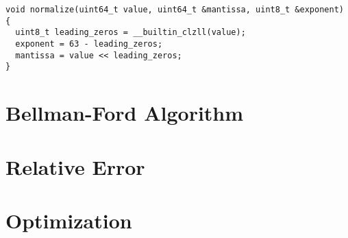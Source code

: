 \documentclass[11pt]{article}
\begin{document}
\begin{verbatim}
void normalize(uint64_t value, uint64_t &mantissa, uint8_t &exponent)
{
  uint8_t leading_zeros = __builtin_clzll(value);
  exponent = 63 - leading_zeros;
  mantissa = value << leading_zeros;
}
\end{verbatim}

\section{Bellman-Ford Algorithm}

\section{Relative Error}

\section{Optimization}

\begin{thebibliography}{9}


\end{thebibliography}
\end{document}
